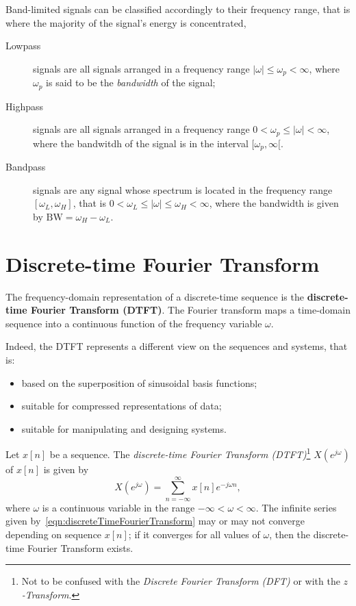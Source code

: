 \documentclass[\documentfontsize, twocolumn]{\classname}
\begin{document}
Band-limited signals can be classified accordingly to their frequency range, that is where the majority of the signal's energy is concentrated,
\begin{description}
    \item[Lowpass] signals are all signals arranged in a frequency range $|\omega| \leq \omega_p < \infty$, where $\omega_p$ is said to be the \emph{bandwidth} of the signal;
    \item[Highpass] signals are all signals arranged in a frequency range $0 < \omega_p \leq |\omega| < \infty$, where the bandwitdh of the signal is in the interval $[\omega_p, \infty[$.
    \item[Bandpass] signals are any signal whose spectrum is located in the frequency range $[\omega_L, \omega_H]$, that is $0 < \omega_L \leq |\omega| \leq \omega_H < \infty$, where the bandwidth is given by $\mathrm{BW} = \omega_H - \omega_L$.
\end{description}

\section{Discrete-time Fourier Transform}
The frequency-domain representation of a discrete-time sequence is the \textbf{discrete-time Fourier Transform (DTFT)}. The Fourier transform maps a time-domain sequence into a continuous function of the frequency variable $\omega$.

Indeed, the DTFT represents a different view on the sequences and systems, that is:
\begin{itemize}
    \item based on the superposition of sinusoidal basis functions;
    \item suitable for compressed representations of data;
    \item suitable for manipulating and designing systems.
\end{itemize}

\begin{defin}
    Let $x[n]$ be a sequence. The \emph{discrete-time Fourier Transform (DTFT)}\footnote{Not to be confused with the \emph{Discrete Fourier Transform (DFT)} or with the \emph{$z$-Transform}.} $X(e^{j\omega})$ of $x[n]$ is given by
    \begin{equation}\label{eqn:discreteTimeFourierTransform}
        X(e^{j\omega}) = \sum_{n=-\infty}^\infty x[n] e^{-j\omega n},
    \end{equation}
    where $\omega$ is a continuous variable in the range $-\infty < \omega < \infty$.
The infinite series given by~\ref{eqn:discreteTimeFourierTransform} may or may not converge depending on sequence $x[n]$; if it converges for all values of $\omega$, then the discrete-time Fourier Transform exists.
\end{defin}
\end{document}
